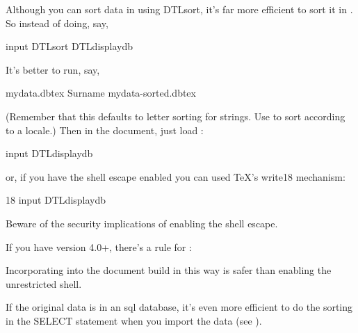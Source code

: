Although you can sort data in  using \gls{DTLsort}, 
it's far more efficient to sort it in . So instead of doing, say,
\begin{codebox}
\gls{input}
\gls{DTLsort}
\gls{DTLdisplaydb}
\end{codebox}
It's better to run, say,
\begin{terminal}
  mydata.dbtex  Surname  mydata-sorted.dbtex
\end{terminal}
(Remember that this defaults to letter sorting for strings. Use
 to sort according to a locale.)
Then in the document, just load :
\begin{codebox}
\gls{input}
\gls{DTLdisplaydb}
\end{codebox}
or, if you have the shell escape enabled you can used \TeX's 
\gls{write18} mechanism:
\begin{codebox}
18
\codepar
\gls{input}
\gls{DTLdisplaydb}
\end{codebox}

\begin{important}
Beware of the security implications of enabling the shell escape.
\end{important}

If you have  version 4.0+, there's a rule for :
\begin{codebox}
\end{codebox}
Incorporating  into the document build in this way
is safer than enabling the unrestricted shell.

\begin{information}
If the original data is in an \gls{sql} database, it's even more efficient to 
do the sorting in the SELECT statement when you import the data (see 
).
\end{information}

